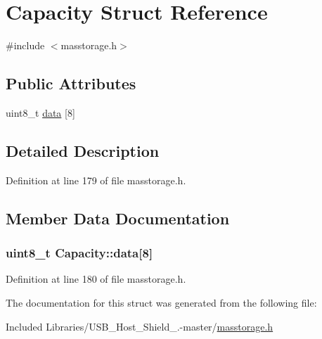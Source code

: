 \hypertarget{struct_capacity}{\section{\-Capacity \-Struct \-Reference}
\label{struct_capacity}
}


{\ttfamily \#include $<$masstorage.\-h$>$}

\subsection*{\-Public \-Attributes}
\begin{DoxyCompactItemize}
\item 
uint8\-\_\-t \hyperlink{struct_capacity_ae6dd521cd2ece3d6fa6fe58180fb9e8a}{data} \mbox{[}8\mbox{]}
\end{DoxyCompactItemize}


\subsection{\-Detailed \-Description}


\-Definition at line 179 of file masstorage.\-h.



\subsection{\-Member \-Data \-Documentation}
\hypertarget{struct_capacity_ae6dd521cd2ece3d6fa6fe58180fb9e8a}{
\subsubsection[{data}]{\setlength{\rightskip}{0pt plus 5cm}uint8\-\_\-t {\bf \-Capacity\-::data}\mbox{[}8\mbox{]}}}\label{struct_capacity_ae6dd521cd2ece3d6fa6fe58180fb9e8a}


\-Definition at line 180 of file masstorage.\-h.



\-The documentation for this struct was generated from the following file\-:\begin{DoxyCompactItemize}
\item 
\-Included Libraries/\-U\-S\-B\-\_\-\-Host\-\_\-\-Shield\-\_.-\/master/\hyperlink{masstorage_8h}{masstorage.\-h}\end{DoxyCompactItemize}
